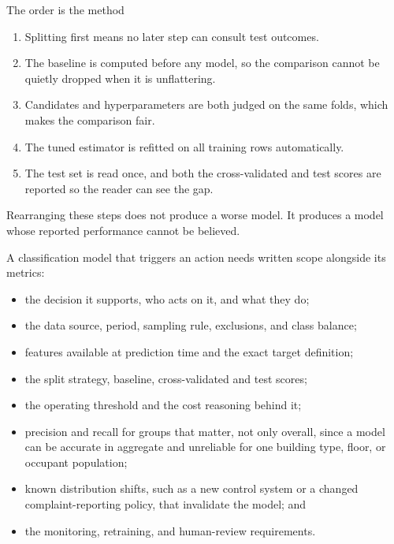 \begin{SyntaxBox}{The order is the method}
\begin{enumerate}
    \item Splitting first means no later step can consult test outcomes.
    \item The baseline is computed before any model, so the comparison cannot be
          quietly dropped when it is unflattering.
    \item Candidates and hyperparameters are both judged on the same folds,
          which makes the comparison fair.
    \item The tuned estimator is refitted on all training rows automatically.
    \item The test set is read once, and both the cross-validated and test scores
          are reported so the reader can see the gap.
\end{enumerate}
Rearranging these steps does not produce a worse model. It produces a model
whose reported performance cannot be believed.
\end{SyntaxBox}


A classification model that triggers an action needs written scope alongside its
metrics:

\begin{itemize}
    \item the decision it supports, who acts on it, and what they do;
    \item the data source, period, sampling rule, exclusions, and class balance;
    \item features available at prediction time and the exact target definition;
    \item the split strategy, baseline, cross-validated and test scores;
    \item the operating threshold and the cost reasoning behind it;
    \item precision and recall for groups that matter, not only overall, since a
          model can be accurate in aggregate and unreliable for one building
          type, floor, or occupant population;
    \item known distribution shifts, such as a new control system or a changed
          complaint-reporting policy, that invalidate the model; and
    \item the monitoring, retraining, and human-review requirements.
\end{itemize}

